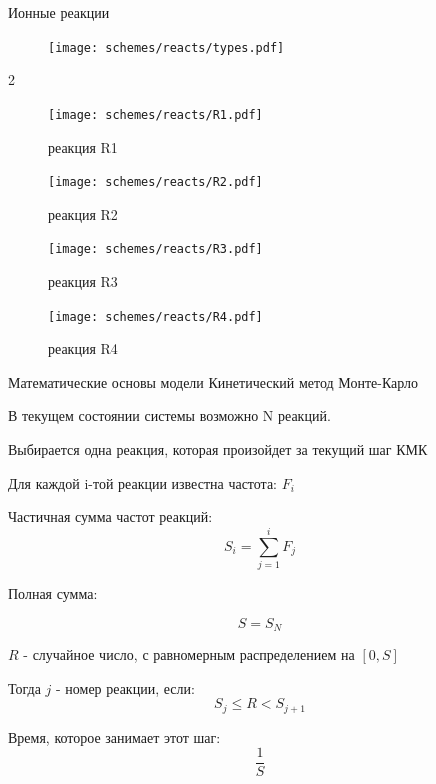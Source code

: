 \documentclass{beamer}%
\begin{document}
\begin{frame}{Ионные реакции}
    \begin{figure}

        \centering
        \texttt{[image: schemes/reacts/types.pdf]}

    \end{figure}

    \begin {multicols} {2}
    \begin{figure}

        \centering
        \texttt{[image: schemes/reacts/R1.pdf]}
        \caption{реакция R1}
        
    \end{figure}
    
    \begin{figure}

        \centering
        \texttt{[image: schemes/reacts/R2.pdf]}
        \caption{реакция R2}

    \end{figure}
    \columnbreak
    \begin{figure}

        \centering
        \texttt{[image: schemes/reacts/R3.pdf]}
        \caption{реакция R3}

    \end{figure}
    \begin{figure}

        \centering
        \texttt{[image: schemes/reacts/R4.pdf]}
        \caption{реакция R4}

    \end{figure}
    \end{multicols}


\end{frame}






\begin{frame}{Математические основы модели} {Кинетический метод Монте-Карло}

\small

В текущем состоянии системы возможно N реакций.

Выбирается одна реакция, которая произойдет за текущий шаг КМК

Для каждой i-той реакции известна частота: 
\(F_i\)

Частичная сумма частот реакций:
\[S_i = \sum_{j=1}^{i}{F_j}\]

Полная сумма:

\[S = S_N\]

$R$ - случайное число, с равномерным распределением на $[0,S]$

Тогда $j$ - номер реакции, если:
\[S_j \le R < S_{j+1}\]

Время, которое занимает этот шаг:
 \[\frac{1}{S}\]

\end{frame}
\end{document}
